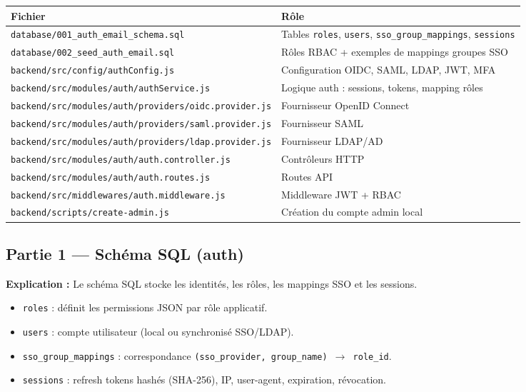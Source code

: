 \documentclass[12pt,a4paper]{article}
\begin{document}
\begin{tabular}{@{}ll@{}}
\toprule
Fichier & Rôle \\
\midrule
\texttt{database/001\_auth\_email\_schema.sql} & Tables \texttt{roles}, \texttt{users}, \texttt{sso\_group\_mappings}, \texttt{sessions} \\
\texttt{database/002\_seed\_auth\_email.sql} & Rôles RBAC + exemples de mappings groupes SSO \\
\texttt{backend/src/config/authConfig.js} & Configuration OIDC, SAML, LDAP, JWT, MFA \\
\texttt{backend/src/modules/auth/authService.js} & Logique auth : sessions, tokens, mapping rôles \\
\texttt{backend/src/modules/auth/providers/oidc.provider.js} & Fournisseur OpenID Connect \\
\texttt{backend/src/modules/auth/providers/saml.provider.js} & Fournisseur SAML \\
\texttt{backend/src/modules/auth/providers/ldap.provider.js} & Fournisseur LDAP/AD \\
\texttt{backend/src/modules/auth/auth.controller.js} & Contrôleurs HTTP \\
\texttt{backend/src/modules/auth/auth.routes.js} & Routes API \\
\texttt{backend/src/middlewares/auth.middleware.js} & Middleware JWT + RBAC \\
\texttt{backend/scripts/create-admin.js} & Création du compte admin local \\
\bottomrule
\end{tabular}

\subsection{Partie 1 --- Schéma SQL (auth)}

\textbf{Explication :} Le schéma SQL stocke les identités, les rôles, les mappings SSO et les sessions.

\begin{itemize}
  \item \texttt{roles} : définit les permissions JSON par rôle applicatif.
  \item \texttt{users} : compte utilisateur (local ou synchronisé SSO/LDAP).
  \item \texttt{sso\_group\_mappings} : correspondance \texttt{(sso\_provider, group\_name) $\rightarrow$ role\_id}.
  \item \texttt{sessions} : refresh tokens hashés (SHA-256), IP, user-agent, expiration, révocation.
\end{itemize}
\end{document}
